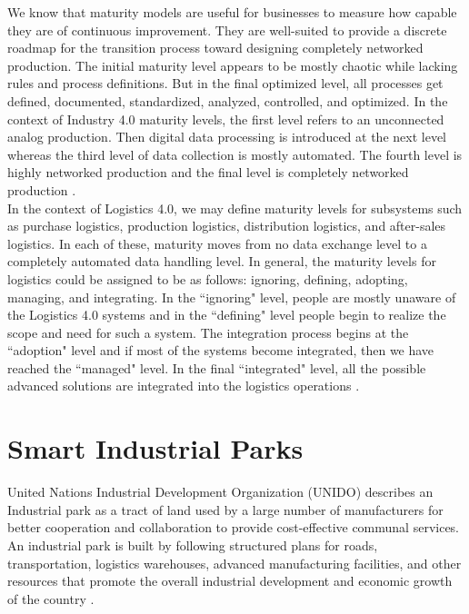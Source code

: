 \documentclass[paper=a4wide, fontsize=12pt]{scrartcl}	 %
\begin{document}
We know that maturity models are useful for businesses to measure how capable they are of continuous improvement. They are well-suited to provide a discrete roadmap for the transition process toward designing completely networked production. The initial maturity level appears to be mostly chaotic while lacking rules and process definitions. But in the final optimized level, all processes get defined, documented, standardized, analyzed, controlled, and optimized. In the context of Industry 4.0 maturity levels, the first level refers to an unconnected analog production. Then digital data processing is introduced at the next level whereas the third level of data collection is mostly automated. The fourth level is highly networked production and the final level is completely networked production \cite{Facchini2019}. \\

In the context of Logistics 4.0, we may define maturity levels for subsystems such as purchase logistics, production logistics, distribution logistics, and after-sales logistics. In each of these, maturity moves from no data exchange level to a completely automated data handling level. In general, the maturity levels for logistics could be assigned to be as follows: ignoring, defining, adopting, managing, and integrating. In the ``ignoring" level, people are mostly unaware of the Logistics 4.0 systems and in the ``defining" level people begin to realize the scope and need for such a system. The integration process begins at the ``adoption" level and if most of the systems become integrated, then we have reached the ``managed" level. In the final ``integrated" level, all the possible advanced solutions are integrated into the logistics operations \cite{Facchini2019}.

\section*{Smart Industrial Parks}

United Nations Industrial Development Organization (UNIDO) describes an Industrial park as a tract of land used by a large number of manufacturers for better cooperation and collaboration to provide cost-effective communal services. An industrial park is built by following structured plans for roads, transportation, logistics warehouses, advanced manufacturing facilities, and other resources that promote the overall industrial development and economic growth of the country \cite{QIU201316}. \\
\end{document}
